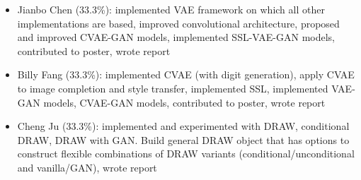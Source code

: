 \documentclass[10pt]{article}
\begin{document}
\begin{itemize}
\item Jianbo Chen (33.3\%): implemented VAE framework on which all other implementations are based, improved convolutional architecture, proposed and improved CVAE-GAN models, implemented SSL-VAE-GAN models, contributed to poster, wrote report
\item Billy Fang (33.3\%): implemented CVAE (with digit generation), apply CVAE to image completion and style transfer, implemented SSL, implemented VAE-GAN models, CVAE-GAN models, contributed to poster, wrote report
\item Cheng Ju (33.3\%): implemented and experimented with DRAW, conditional DRAW, DRAW with GAN. Build general DRAW object that has options to construct flexible combinations of DRAW variants (conditional/unconditional and vanilla/GAN), wrote report
\end{itemize}















\nocite{*}
\end{document}
